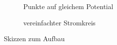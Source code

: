\begin{figure}[h]
	\begin{subfigure}[b]{0.5\textwidth}
		\centering
		
		\caption{Punkte auf gleichem Potential}
		\label{fig:wdsstreckeep}
	\end{subfigure}
	\begin{subfigure}[b]{0.5\textwidth}
		\centering
		
		\caption{vereinfachter Stromkreis}
		\label{fig:wdsstreckes}	
	\end{subfigure}
	\caption{Skizzen zum Aufbau}
\end{figure}
	
